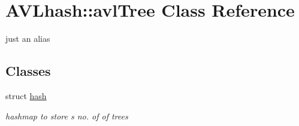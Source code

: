 \hypertarget{class_a_v_lhash_1_1avl_tree}{\section{A\-V\-Lhash\-:\-:avl\-Tree Class Reference}
\label{class_a_v_lhash_1_1avl_tree}
}


just an alias  


\subsection*{Classes}
\begin{DoxyCompactItemize}
\item 
struct \hyperlink{struct_a_v_lhash_1_1avl_tree_1_1hash}{hash}
\begin{DoxyCompactList}\small\item\em hashmap to store s no. of of trees \end{DoxyCompactList}\end{DoxyCompactItemize}
